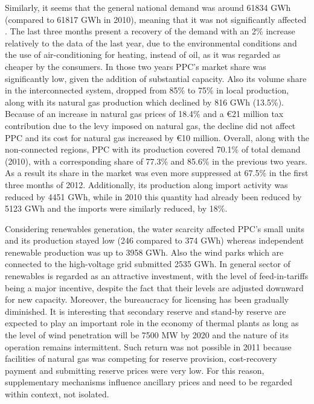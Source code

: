 \par Similarly, it seems that the general national demand was around 61834 GWh (compared to 61817 GWh in 2010), meaning that it was not significantly affected \cite{deddie}. The last three months present a recovery of the demand with an 2\% increase relatively to the data of the last year, due to the environmental conditions and the use of air-conditioning for heating, instead of oil, as it was regarded as cheaper by the consumers. In those two years PPC’s market share was significantly low, given the addition of substantial capacity. Also its volume share in the interconnected system, dropped from 85\% to 75\% in local production, along with its natural gas production which declined by 816 GWh (13.5\%). Because of an increase in natural gas prices of 18.4\% and a €21 million tax contribution due to the levy imposed on natural gas, the decline did not affect PPC and its cost for natural gas increased by €10 million. Overall, along with the non-connected regions, PPC with its production covered 70.1\% of total demand (2010), with a corresponding share of 77.3\% and 85.6\% in the previous two years. As a result its share in the market was even more suppressed at 67.5\% in the first three months of 2012. Additionally, its production along import activity was reduced by 4451 GWh, while in 2010 this quantity had already been reduced by 5123 GWh and the imports were similarly reduced, by 18\%. 
\par Considering renewables generation, the water scarcity affected PPC’s small units and its production stayed low (246 compared to 374 GWh) whereas independent renewable production was up to 3958 GWh. Also the wind parks which are connected to the high-voltage grid submitted 2535 GWh. In general sector of renewables is regarded as an attractive investment, with the level of feed-in-tariffs being a major incentive, despite the fact that their levels are adjusted downward for new capacity. Moreover, the bureaucracy for licensing has been gradually diminished. It is interesting that secondary reserve and stand-by reserve are expected to play an important role in the economy of thermal plants as long as the level of wind penetration will be 7500 MW by 2020 and the nature of its operation remains intermittent. Such return was not possible in 2011 because facilities of natural gas was competing for reserve provision, cost-recovery payment and submitting reserve prices were very low. For this reason, supplementary mechanisms influence ancillary prices and need to be regarded within context, not isolated. 
